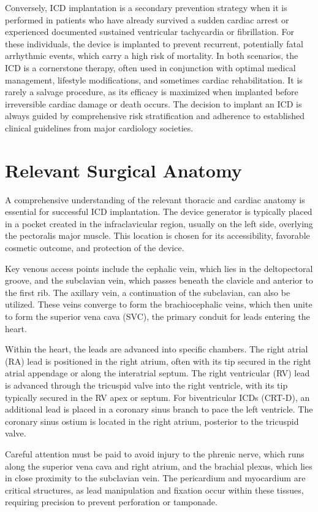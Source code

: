 Conversely, ICD implantation is a secondary prevention strategy when it is performed in patients who have already survived a sudden cardiac arrest or experienced documented sustained ventricular tachycardia or fibrillation. For these individuals, the device is implanted to prevent recurrent, potentially fatal arrhythmic events, which carry a high risk of mortality. In both scenarios, the ICD is a cornerstone therapy, often used in conjunction with optimal medical management, lifestyle modifications, and sometimes cardiac rehabilitation. It is rarely a salvage procedure, as its efficacy is maximized when implanted before irreversible cardiac damage or death occurs. The decision to implant an ICD is always guided by comprehensive risk stratification and adherence to established clinical guidelines from major cardiology societies.

\section*{Relevant Surgical Anatomy}
A comprehensive understanding of the relevant thoracic and cardiac anatomy is essential for successful ICD implantation. The device generator is typically placed in a pocket created in the infraclavicular region, usually on the left side, overlying the pectoralis major muscle. This location is chosen for its accessibility, favorable cosmetic outcome, and protection of the device. 

Key venous access points include the cephalic vein, which lies in the deltopectoral groove, and the subclavian vein, which passes beneath the clavicle and anterior to the first rib. The axillary vein, a continuation of the subclavian, can also be utilized. These veins converge to form the brachiocephalic veins, which then unite to form the superior vena cava (SVC), the primary conduit for leads entering the heart.

Within the heart, the leads are advanced into specific chambers. The right atrial (RA) lead is positioned in the right atrium, often with its tip secured in the right atrial appendage or along the interatrial septum. The right ventricular (RV) lead is advanced through the tricuspid valve into the right ventricle, with its tip typically secured in the RV apex or septum. For biventricular ICDs (CRT-D), an additional lead is placed in a coronary sinus branch to pace the left ventricle. The coronary sinus ostium is located in the right atrium, posterior to the tricuspid valve. 

Careful attention must be paid to avoid injury to the phrenic nerve, which runs along the superior vena cava and right atrium, and the brachial plexus, which lies in close proximity to the subclavian vein. The pericardium and myocardium are critical structures, as lead manipulation and fixation occur within these tissues, requiring precision to prevent perforation or tamponade.

